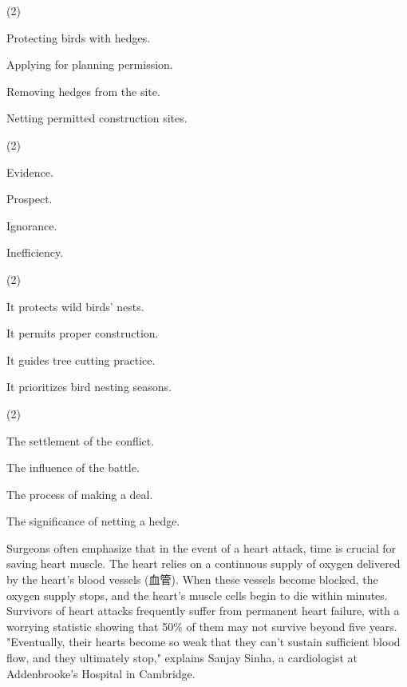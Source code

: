 \documentclass{英语试卷}
\begin{document}
\begin{choices}(2)
  \item Protecting birds with hedges.
  \item Applying for planning permission.
  \item Removing hedges from the site.
  \item Netting permitted construction sites.
\end{choices}
\begin{choices}(2)
  \item Evidence.
  \item Prospect.
  \item Ignorance.
  \item Inefficiency.
\end{choices}
\begin{choices}(2)
  \item It protects wild birds' nests.
  \item It permits proper construction.
  \item It guides tree cutting practice.
  \item It prioritizes bird nesting seasons.
\end{choices}
\begin{choices}(2)
  \item The settlement of the conflict.
  \item The influence of the battle.
  \item The process of making a deal.
  \item The significance of netting a hedge.
\end{choices}
\par Surgeons often emphasize that in the event of a heart attack, time is crucial for saving heart muscle. The heart relies on a continuous supply of oxygen delivered by the heart's blood vessels (血管). When these vessels become blocked, the oxygen supply stops, and the heart's muscle cells begin to die within minutes. Survivors of heart attacks frequently suffer from permanent heart failure, with a worrying statistic showing that 50\% of them may not survive beyond five years. "Eventually, their hearts become so weak that they can’t sustain sufficient blood flow, and they ultimately stop," explains Sanjay Sinha, a cardiologist at Addenbrooke’s Hospital in Cambridge.\par
\end{document}
